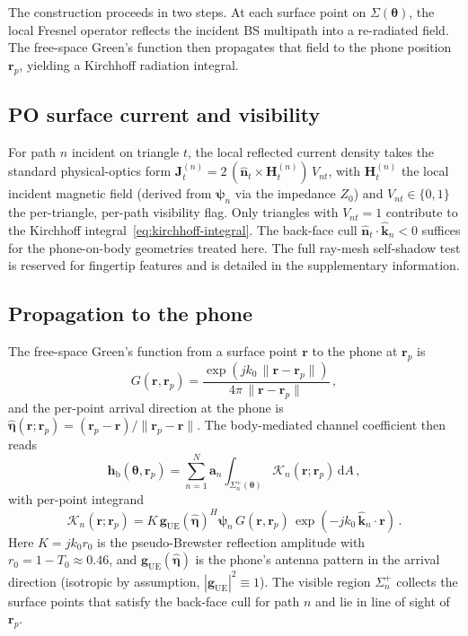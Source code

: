 \documentclass[journal,twocolumn,10pt]{IEEEtran}
\theoremstyle{plain}
\theoremstyle{definition}
\theoremstyle{remark}
\newcommand{\khat}{\hat{\bm{k}}}
\newcommand{\nhat}{\hat{\bm{n}}}
\newcommand{\etahat}{\hat{\bm{\eta}}}
\newcommand{\rr}{\mathbf{r}}
\newcommand{\HH}{\mathbf{H}}
\newcommand{\psin}{\bm{\psi}_n}
\newcommand{\thetab}{\bm{\theta}}
\newcommand{\hbody}{\bm{h}_{\mathrm{b}}}
\newcommand{\Tepskin}{T_{0}}
\begin{document}

The construction proceeds in two steps. At each surface point on
$\Sigma(\thetab)$, the local Fresnel operator reflects the incident
BS multipath into a re-radiated field. The free-space Green's
function then propagates that field to the phone position $\rr_p$,
yielding a Kirchhoff radiation integral.

\subsection{PO surface current and visibility}

For path $n$ incident on triangle $t$, the local reflected current
density takes the standard physical-optics form $\bm{J}^{(n)}_t =
2\,(\nhat_t \times \HH^{(n)}_t)\,V_{nt}$, with $\HH^{(n)}_t$ the
local incident magnetic field (derived from $\psin$ via the
impedance $Z_0$) and $V_{nt} \in \{0,1\}$ the per-triangle, per-path
visibility flag. Only triangles with $V_{nt}=1$ contribute to the
Kirchhoff integral~\eqref{eq:kirchhoff-integral}. The back-face
cull $\nhat_t \cdot \khat_n < 0$ suffices for the phone-on-body
geometries treated here. The full ray-mesh self-shadow test is
reserved for fingertip features and is detailed in the
supplementary information.

\subsection{Propagation to the phone}

The free-space Green's function from a surface point $\rr$ to the
phone at $\rr_p$ is
\begin{equation}
G(\rr,\rr_p) = \frac{\exp(jk_0\,\|\rr-\rr_p\|)}{4\pi\,\|\rr-\rr_p\|} \,,
\end{equation}
and the per-point arrival direction at the phone is
$\etahat(\rr;\rr_p) = (\rr_p - \rr)/\|\rr_p - \rr\|$. The
body-mediated channel coefficient then reads
\begin{equation}\label{eq:kirchhoff-integral}
\hbody(\thetab,\rr_p) = \sum_{n=1}^{N} \bm{a}_n
\int_{\Sigma_n^{+}(\thetab)} \mathcal{K}_n(\rr;\rr_p)\,\mathrm{d}A \,,
\end{equation}
with per-point integrand
\begin{equation}\label{eq:kernel}
\mathcal{K}_n(\rr;\rr_p) = K\,\bm{g}_{\mathrm{UE}}(\etahat)^{H}\psin
\,G(\rr,\rr_p)\,\exp(-jk_0\,\khat_n\cdot\rr) \,.
\end{equation}
Here $K = jk_0 r_0$ is the pseudo-Brewster reflection amplitude with
$r_0 = 1 - \Tepskin \approx 0.46$, and $\bm{g}_{\mathrm{UE}}(\etahat)$
is the phone's antenna pattern in the arrival direction (isotropic
by assumption, $|\bm{g}_{\mathrm{UE}}|^2 \equiv 1$). The visible
region $\Sigma_n^{+}$ collects the surface points that satisfy the
back-face cull for path $n$ and lie in line of sight of $\rr_p$.
\end{document}
